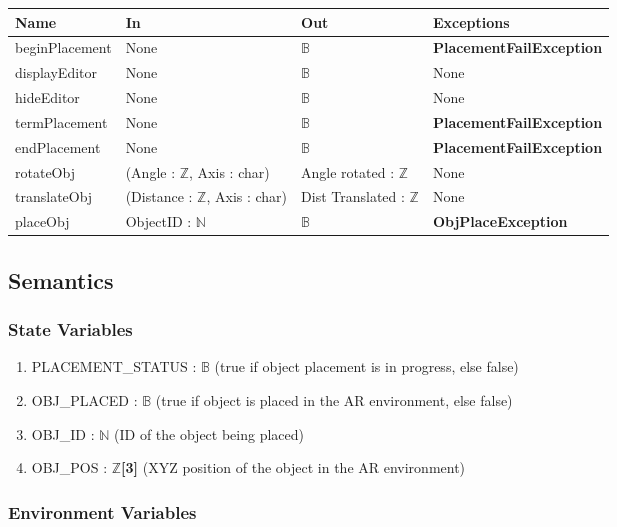 \documentclass[12pt, titlepage]{article}
\begin{document}
\begin{center}
  \begin{tabular}{p{3cm} p{4cm} p{4cm} p{4cm}}
    \hline
    \textbf{Name} & \textbf{In} & \textbf{Out} & \textbf{Exceptions} \\
    \hline
    beginPlacement & None & $\mathbb{B}$ & \textbf{PlacementFailException} \\
    \hline
    displayEditor & None & $\mathbb{B}$ & None \\
    \hline
    hideEditor & None & $\mathbb{B}$ & None \\
    \hline
    termPlacement & None & $\mathbb{B}$ & \textbf{PlacementFailException} \\
    \hline
    endPlacement & None & $\mathbb{B}$ & \textbf{PlacementFailException} \\
    \hline
    rotateObj & (Angle : $\mathbb{Z}$, Axis : char) & Angle rotated : $\mathbb{Z}$ & None \\
    \hline
    translateObj & (Distance : $\mathbb{Z}$, Axis : char) & Dist Translated : $\mathbb{Z}$ & None \\
    \hline
    placeObj & ObjectID : $\mathbb{N}$ & $\mathbb{B}$ & \textbf{ObjPlaceException} \\
    \hline
\end{tabular}
\end{center}

\subsection{Semantics}

\subsubsection{State Variables}

\begin{enumerate}
  \item PLACEMENT\_STATUS : $\mathbb{B}$ (true if object placement is in progress, else false)
  \item OBJ\_PLACED : $\mathbb{B}$ (true if object is placed in the AR environment, else false)
  \item OBJ\_ID : $\mathbb{N}$ (ID of the object being placed)
  \item OBJ\_POS : $\mathbb{Z}$\textbf{[3]} (XYZ position of the object in the AR environment)
\end{enumerate}

\subsubsection{Environment Variables}
\end{document}
